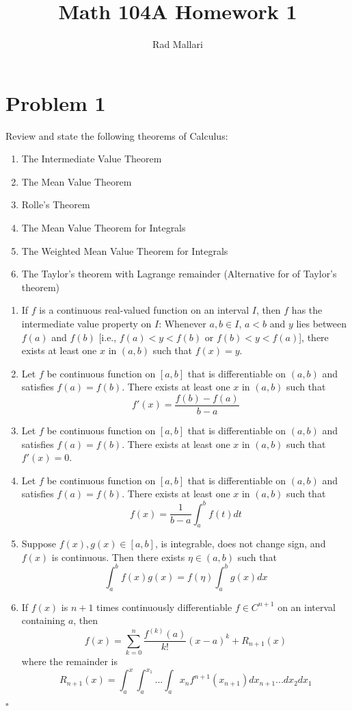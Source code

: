 \documentclass[12pt]{article}
\title{Math 104A Homework 1}
\author{Rad Mallari}
\newenvironment{proof}{\noindent{\bf Proof.}}{\hfill $\square$\medskip}
\begin{document}
\maketitle

\section{Problem 1}
Review and state the following theorems of Calculus:
\begin{enumerate}[label=\textbf{(\alph*)}]
    \item The Intermediate Value Theorem
    \item The Mean Value Theorem
    \item Rolle's Theorem
    \item The Mean Value Theorem for Integrals
    \item The Weighted Mean Value Theorem for Integrals
    \item The Taylor's theorem with Lagrange remainder (Alternative for of Taylor's theorem)
\end{enumerate}

\begin{proof}
\begin{enumerate}[label=\textbf{(\alph*)}]
    \item If $f$ is a continuous real-valued function on an interval $I$, then $f$ has the intermediate value property on $I$: Whenever $a,b\in I$, $a < b$ and $y$ lies between $f(a)$ and $f(b)$ [i.e., $f(a)<y<f(b)$ or $f(b)<y<f(a)$], there exists at least one $x$ in $(a,b)$ such that $f(x)=y$.
    \item Let $f$ be continuous function on $[a,b]$ that is differentiable on $(a,b)$ and satisfies $f(a)=f(b)$. There exists at least one $x$ in $(a,b)$ such that $$f'(x)=\frac{f(b)-f(a)}{b-a}$$
    \item Let $f$ be continuous function on $[a,b]$ that is differentiable on $(a,b)$ and satisfies $f(a)=f(b)$. There exists at least one $x$ in $(a,b)$ such that $f'(x)=0$.
    \item  Let $f$ be continuous function on $[a,b]$ that is differentiable on $(a,b)$ and satisfies $f(a)=f(b)$. There exists at least one $x$ in $(a,b)$ such that $$f(x)=\frac{1}{b-a}\int_{a}^{b}f(t)dt$$
    \item Suppose $f(x), g(x)\in [a,b]$, is integrable, does not change sign, and $f(x)$ is continuous. Then there exists $\eta\in (a,b)$ such that $$\int_{a}^{b}f(x)g(x)=f(\eta)\int_{a}^{b}g(x)dx$$
    \item If $f(x)$ is $n+1$ times continuously differentiable $f\in C^{n+1}$ on an interval containing $a$, then $$f(x)=\sum_{k=0}^{n}\frac{f^{(k)}(a)}{k!}(x-a)^{k}+R_{n+1}(x)$$
    where the remainder is
    $$R_{n+1}(x)=\int_{a}^{x}\int_{a}^{x_{1}}...\int_{a}{x_{n}}f^{n+1}(x_{n+1})dx_{n+1}...dx_{2}dx_{1}$$
\end{enumerate}
\end{proof}
\end{document}
